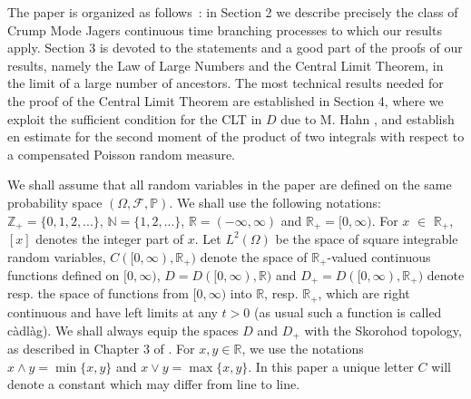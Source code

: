 \documentclass[11pt]{article}
\def\R{{\mathbb R}}
\begin{document}
The paper is organized as follows : in Section 2 we describe precisely the class of  Crump Mode Jagers continuous time branching processes to which our results apply. Section 3 is devoted to the statements and a good part of the proofs of our results, namely the Law of Large Numbers and the Central Limit Theorem, in the limit of a large number of ancestors. The most technical results needed for the proof of the Central Limit Theorem are established in Section 4, where we exploit the sufficient condition for the CLT in $D$ due to M. Hahn  \cite{MH}, and establish en estimate for the second moment of the product of two integrals with respect to a compensated Poisson random measure.


 We shall assume that all random variables in the paper are defined on the same probability space $( \Omega,\mathcal{F},\mathbb{P})$. We shall use the following notations: $\mathbb{Z}_+=\{0,1, 2,... \}$, $\mathbb{N}=\{1, 2,... \}$, $\mathbb{R}=(-\infty, \infty)$ and $\mathbb{R}_+=[0, \infty)$. For $x$ $\in$ $\mathbb{R}_+$, $[x]$ denotes the integer part of $x$. Let $L^2(\Omega)$ be the space of square integrable random variables, $C([0,\infty), \mathbb{R}_+)$ denote the space of $\mathbb{R}_+$-valued continuous functions defined on $[0,\infty)$, $D=D([0,\infty), \mathbb{R})$ and $D_+=D([0,\infty), \mathbb{R}_+)$ denote resp. the space of functions from $[0,\infty)$ into $\mathbb{R}$, resp. $\mathbb{R}_+$, which are right continuous and have left limits at any $t>0$ (as usual such a function is called c\`adl\`ag). We shall always equip the spaces $D$ and $D_+$ with the Skorohod topology, as described in Chapter 3 of \cite{Bill}. For $x,y\in \R$, we use the notations $x \wedge y = \min\{x,y\}$ and $x \vee y= \max\{x,y\}$.  In this paper a unique letter $C$ will denote a constant which may differ from line to line. 
\end{document}
